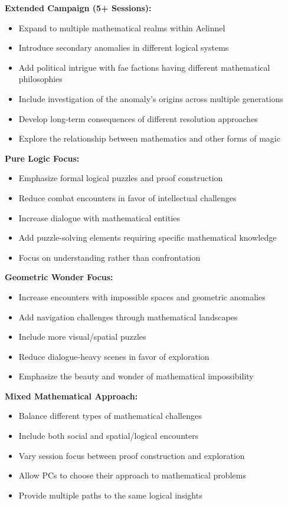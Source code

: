 \documentclass[11pt]{article}
\begin{document}
\textbf{Extended Campaign (5+ Sessions):}
\begin{itemize}
    \item Expand to multiple mathematical realms within Aelinnel
    \item Introduce secondary anomalies in different logical systems
    \item Add political intrigue with fae factions having different mathematical philosophies
    \item Include investigation of the anomaly's origins across multiple generations
    \item Develop long-term consequences of different resolution approaches
    \item Explore the relationship between mathematics and other forms of magic
\end{itemize}

\textbf{Pure Logic Focus:}
\begin{itemize}
    \item Emphasize formal logical puzzles and proof construction
    \item Reduce combat encounters in favor of intellectual challenges
    \item Increase dialogue with mathematical entities
    \item Add puzzle-solving elements requiring specific mathematical knowledge
    \item Focus on understanding rather than confrontation
\end{itemize}

\textbf{Geometric Wonder Focus:}
\begin{itemize}
    \item Increase encounters with impossible spaces and geometric anomalies
    \item Add navigation challenges through mathematical landscapes
    \item Include more visual/spatial puzzles
    \item Reduce dialogue-heavy scenes in favor of exploration
    \item Emphasize the beauty and wonder of mathematical impossibility
\end{itemize}

\textbf{Mixed Mathematical Approach:}
\begin{itemize}
    \item Balance different types of mathematical challenges
    \item Include both social and spatial/logical encounters
    \item Vary session focus between proof construction and exploration
    \item Allow PCs to choose their approach to mathematical problems
    \item Provide multiple paths to the same logical insights
\end{itemize}
\end{document}
